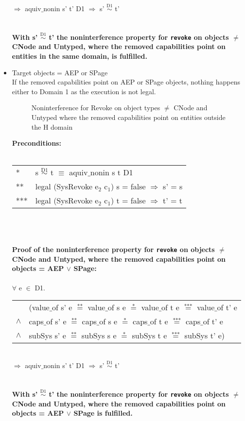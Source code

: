 \begin{itemize}
\begin{tabular}{ll}
\end{tabular} \\
$\Rightarrow$ aquiv$\_$nonin s' t' D1 $\Rightarrow$ s' $\overset{\text{D1}}{\sim}$ t' \\ \\ \\
\textbf{With s' $\overset{\text{D1}}{\sim}$ t' the noninterference property for \texttt{revoke} on objects $\neq$ CNode and Untyped, where the removed capabilities point on entities in the same domain, is fulfilled.}  
\clearpage
\item Target objects = AEP or SPage \\
If the removed capabilities point on AEP or SPage objects, nothing happens either to Domain 1 as the execution is not legal. 
\begin{flushleft}
\begin{figure}[H]
\caption{Noninterference for Revoke on object types $\neq$ CNode and Untyped where the removed capabilities point on entities outside the H domain}
\label{fig:RevokeOutside2}
\end{figure}
\end{flushleft}
\textbf{Preconditions:} \\ \\
\begin{tabular}{ll}
* & s $\overset{\text{D1}}{\sim}$ t $\equiv$ aquiv$\_$nonin s t D1	\\ 
** & legal (SysRevoke e$_2$ c$_1$) s = false $\Rightarrow$ s' = s \\ 
*** & legal (SysRevoke e$_2$ c$_1$) t = false $\Rightarrow$ t' = t
\end{tabular} \\ \\ \\
\textbf{Proof of the noninterference property for \texttt{revoke} on objects $\neq$ CNode and Untyped, where the removed capabilities point on objects = AEP $\vee$ SPage:}\\ \\
$\forall$ e $\in$ D1. \\
\begin{tabular}{ll}
& (value$\_$of s' e $\overset{\text{**}}{=}$ value$\_$of s e $\overset{\text{*}}{=}$ value$\_$of t e $\overset{\text{***}}{=}$ value$\_$of t' e \\
$\wedge$ & caps$\_$of s' e $\overset{\text{**}}{=}$ caps$\_$of s e $\overset{\text{*}}{=}$ caps$\_$of t e $\overset{\text{***}}{=}$ caps$\_$of t' e \\
$\wedge$ & subSys s' e $\overset{\text{**}}{=}$ subSys s e $\overset{\text{*}}{=}$ subSys t e $\overset{\text{***}}{=}$ subSys t' e)
\end{tabular} \\
$\Rightarrow$ aquiv$\_$nonin s' t' D1 $\Rightarrow$ s' $\overset{\text{D1}}{\sim}$ t' \\ \\ \\
\textbf{With s' $\overset{\text{D1}}{\sim}$ t' the noninterference property for \texttt{revoke} on objects $\neq$ CNode and Untyped, where the removed capabilities point on objects = AEP $\vee$ SPage is fulfilled.}  
\end{itemize}